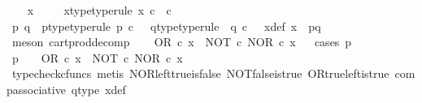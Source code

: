 \begin{isabellebody}
\ \ \isamarkupfalse%
\ x\ \isanewline
\ \ \isamarkupfalse%
\ x{\isacharunderscore}{\kern0pt}type{\isacharbrackleft}{\kern0pt}type{\isacharunderscore}{\kern0pt}rule{\isacharbrackright}{\kern0pt}{\isacharcolon}{\kern0pt}\ {\isachardoublequoteopen}x\ {\isasymin}\isactrlsub c\ {\isasymOmega}\ {\isasymtimes}\isactrlsub c\ {\isasymOmega}{\isachardoublequoteclose}\isanewline
\ \ \isamarkupfalse%
\ \isamarkupfalse%
\ p\ q\ \ p{\isacharunderscore}{\kern0pt}type{\isacharbrackleft}{\kern0pt}type{\isacharunderscore}{\kern0pt}rule{\isacharbrackright}{\kern0pt}{\isacharcolon}{\kern0pt}\ {\isachardoublequoteopen}p\ {\isasymin}\isactrlsub c\ {\isasymOmega}{\isachardoublequoteclose}\ \ q{\isacharunderscore}{\kern0pt}type{\isacharbrackleft}{\kern0pt}type{\isacharunderscore}{\kern0pt}rule{\isacharbrackright}{\kern0pt}{\isacharcolon}{\kern0pt}\ \ {\isachardoublequoteopen}q\ {\isasymin}\isactrlsub c\ {\isasymOmega}{\isachardoublequoteclose}\ \ x{\isacharunderscore}{\kern0pt}def{\isacharcolon}{\kern0pt}\ {\isachardoublequoteopen}x\ {\isacharequal}{\kern0pt}\ {\isasymlangle}p{\isacharcomma}{\kern0pt}q{\isasymrangle}{\isachardoublequoteclose}\isanewline
\ \ \ \ \isamarkupfalse%
\ {\isacharparenleft}{\kern0pt}meson\ cart{\isacharunderscore}{\kern0pt}prod{\isacharunderscore}{\kern0pt}decomp{\isacharparenright}{\kern0pt}\isanewline
\ \ \isamarkupfalse%
\ {\isachardoublequoteopen}OR\ {\isasymcirc}\isactrlsub c\ x\ {\isacharequal}{\kern0pt}\ {\isacharparenleft}{\kern0pt}NOT\ {\isasymcirc}\isactrlsub c\ NOR{\isacharparenright}{\kern0pt}\ {\isasymcirc}\isactrlsub c\ x{\isachardoublequoteclose}\isanewline
\ \ \isamarkupfalse%
{\isacharparenleft}{\kern0pt}cases\ {\isachardoublequoteopen}p\ {\isacharequal}{\kern0pt}\ {\isasymt}{\isachardoublequoteclose}{\isacharparenright}{\kern0pt}\isanewline
\ \ \ \ \isamarkupfalse%
\ {\isachardoublequoteopen}p\ {\isacharequal}{\kern0pt}\ {\isasymt}\ {\isasymLongrightarrow}\ OR\ {\isasymcirc}\isactrlsub c\ x\ {\isacharequal}{\kern0pt}\ {\isacharparenleft}{\kern0pt}NOT\ {\isasymcirc}\isactrlsub c\ NOR{\isacharparenright}{\kern0pt}\ {\isasymcirc}\isactrlsub c\ x{\isachardoublequoteclose}\isanewline
\ \ \ \ \ \ \isamarkupfalse%
\ {\isacharparenleft}{\kern0pt}typecheck{\isacharunderscore}{\kern0pt}cfuncs{\isacharcomma}{\kern0pt}\ metis\ NOR{\isacharunderscore}{\kern0pt}left{\isacharunderscore}{\kern0pt}true{\isacharunderscore}{\kern0pt}is{\isacharunderscore}{\kern0pt}false\ NOT{\isacharunderscore}{\kern0pt}false{\isacharunderscore}{\kern0pt}is{\isacharunderscore}{\kern0pt}true\ OR{\isacharunderscore}{\kern0pt}true{\isacharunderscore}{\kern0pt}left{\isacharunderscore}{\kern0pt}is{\isacharunderscore}{\kern0pt}true\ comp{\isacharunderscore}{\kern0pt}associative{}\ q{\isacharunderscore}{\kern0pt}type\ x{\isacharunderscore}{\kern0pt}def{\isacharparenright}{\kern0pt}\isanewline

\end{isabellebody}
